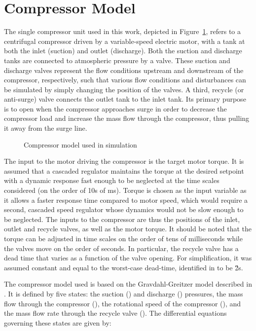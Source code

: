 \section{Compressor Model}
\label{sec:mod:comp}

The single compressor unit used in this work, depicted in Figure~\ref{fig:mod:single_comp}, refers to a centrifugal compressor driven by a variable-speed electric motor, with a tank at both the inlet (suction) and outlet (discharge).
Both the suction and discharge tanks are connected to atmospheric pressure by a valve.
These suction and discharge valves represent the flow conditions upstream and downstream of the compressor, respectively, such that various flow conditions and disturbances can be simulated by simply changing the position of the valves.
A third, recycle (or anti-surge) valve connects the outlet tank to the inlet tank. Its primary purpose is to open when the compressor approaches surge in order to decrease the compressor load and increase the mass flow through the compressor, thus pulling it away from the surge line.

\begin{figure}
  \centering
  \resizebox{0.7\linewidth}{!}{%
    \begin{tikzpicture}
      \drawcomp
    \end{tikzpicture}
  }
  \caption{Compressor model used in simulation}
  \label{fig:mod:single_comp}
\end{figure}


The input to the motor driving the compressor is the target motor torque.
It is assumed that a cascaded regulator maintains the torque at the desired setpoint with a dynamic response fast enough to be neglected at the time scales considered (on the order of 10s of ms).
Torque is chosen as the input variable as it allows a faster response time compared to motor speed, which would require a second, cascaded speed regulator whose dynamics would not be slow enough to be neglected.
The inputs to the compressor are thus the positions of the inlet, outlet and recycle valves, as well as the motor torque.
It should be noted that the torque can be adjusted in time scales on the order of tens of milliseconds while the valves move on the order of seconds.
In particular, the recycle valve has a dead time that varies as a function of the valve opening. For simplification, it was assumed constant and equal to the worst-case dead-time, identified in \cite{Cortinovis2015} to be \u{2}{s}.


The compressor model used is based on the Gravdahl-Greitzer model described in \cite{Gravdahl1999}. It is defined by five states: the suction () and discharge () pressures, the mass flow through the compressor (), the rotational speed of the compressor (), and the mass flow rate through the recycle valve ().
The differential equations governing these states are given by:

